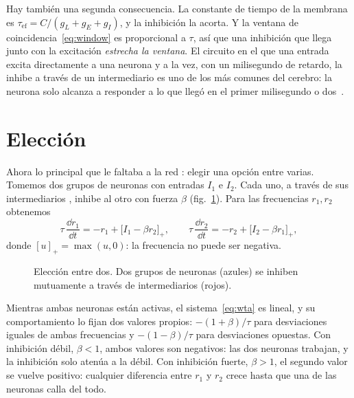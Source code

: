 Hay también una segunda consecuencia. La constante de tiempo de la membrana es $\tau_{\text{ef}}=C/(g_L+g_E+g_I)$, y la inhibición la acorta. Y la ventana de coincidencia~\eqref{eq:window} es proporcional a $\tau$, así que una inhibición que llega junto con la excitación \emph{estrecha la ventana}. El circuito en el que una entrada excita directamente a una neurona y a la vez, con un milisegundo de retardo, la inhibe a través de un intermediario  es uno de los más comunes del cerebro: la neurona solo alcanza a responder a lo que llegó en el primer milisegundo o dos~\cite{Pouille2001}.

\section{Elección}

Ahora lo principal que le faltaba a la red : elegir una opción entre varias. Tomemos dos grupos de neuronas  con entradas $I_1$ e $I_2$. Cada uno, a través de sus intermediarios , inhibe al otro con fuerza $\beta$ (fig.~\ref{fig:wta}). Para las frecuencias $r_1,r_2$ obtenemos
\begin{equation}
\tau\,\frac{\dd r_1}{\dd t} = -r_1 + \bigl[I_1-\beta r_2\bigr]_+ ,\qquad
\tau\,\frac{\dd r_2}{\dd t} = -r_2 + \bigl[I_2-\beta r_1\bigr]_+ ,
\label{eq:wta}
\end{equation}
donde $[u]_+=\max(u,0)$: la frecuencia no puede ser negativa.

\begin{figure}[t]
\centering
{}
\caption{Elección entre dos. Dos grupos de neuronas  (azules) se inhiben mutuamente a través de intermediarios  (rojos).}
\label{fig:wta}
\end{figure}

Mientras ambas neuronas están activas, el sistema~\eqref{eq:wta} es lineal, y su comportamiento lo fijan dos valores propios: $-(1+\beta)/\tau$ para desviaciones iguales de ambas frecuencias y $-(1-\beta)/\tau$ para desviaciones opuestas. Con inhibición débil, $\beta<1$, ambos valores son negativos: las dos neuronas trabajan, y la inhibición solo atenúa a la débil. Con inhibición fuerte, $\beta>1$, el segundo valor se vuelve positivo: cualquier diferencia entre $r_1$ y $r_2$ crece hasta que una de las neuronas calla del todo.

